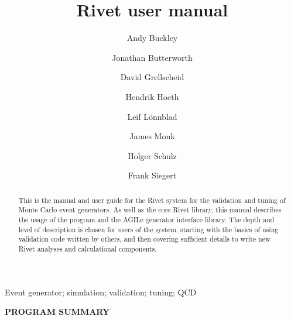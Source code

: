 \documentclass[preprint,12pt]{elsarticle}
\begin{document}
\begin{frontmatter}
  
  \title{Rivet user manual}

  \author[a]{Andy Buckley}
  \author[b]{Jonathan Butterworth}
  \author[c]{David Grellscheid}
  \author[c]{Hendrik Hoeth}
  \author[d]{Leif L\"onnblad}
  \author[b]{James Monk}
  \author[e]{Holger Schulz}
  \author[f]{Frank Siegert}

  \address[a]{PPE Group, School of Physics, University of Edinburgh, UK.}
  \address[b]{HEP Group, Dept. of Physics and Astronomy, UCL, London, UK.}
  \address[c]{IPPP, Durham University, UK.}
  \address[d]{Theoretical Physics, Lund University, Sweden.}
  \address[e]{Institut f\"ur Physik, Berlin Humboldt University, Germany.}
  \address[f]{Physikalisches Institut, Freiburg University, Germany.}


  \begin{abstract}
    This is the manual and user guide for the Rivet system for the
    validation and tuning of Monte Carlo event generators. As well as the core
    Rivet library, this manual describes the usage of the  program and
    the AGILe generator interface library. The depth and level of description is
    chosen for users of the system, starting with the basics of using validation
    code written by others, and then covering sufficient details to write new
    Rivet analyses and calculational components.
  \end{abstract}

  \begin{keyword}
    Event generator; simulation; validation; tuning; QCD
  \end{keyword}

\end{frontmatter}


{\bf PROGRAM SUMMARY}
\end{document}
